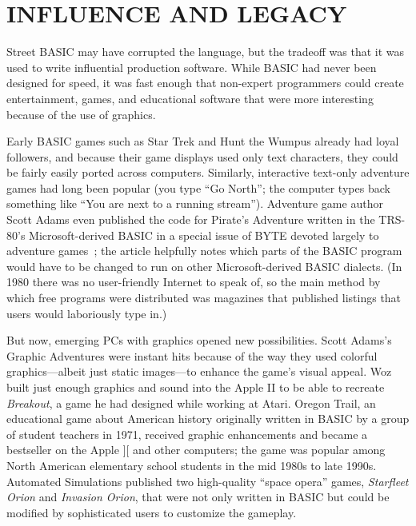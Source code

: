 

\section{INFLUENCE AND LEGACY}


Street BASIC may have corrupted the language, but the tradeoff was that
it was used to write influential production software.
While BASIC had never been designed for speed, it was fast enough that
non-expert programmers 
could create entertainment, games, and educational software that were
more interesting because of the use of graphics.

Early BASIC games such as Star Trek and Hunt the Wumpus already had loyal
followers, and because their game displays used only text characters,
they could be fairly easily ported across computers.
Similarly, interactive text-only adventure games had long been
popular (you type ``Go North''; the computer types back something like
``You are next to a running stream'').  Adventure game author Scott
Adams even published the code for Pirate's Adventure 
written in the 
TRS-80's Microsoft-derived BASIC in a special issue of BYTE devoted
largely to adventure games~\cite{byte80:adventure}; the article
helpfully notes which parts of the BASIC program would have to be
changed to run on other Microsoft-derived BASIC dialects.  (In 1980
there was no user-friendly Internet to speak of, so the main method by
which free programs were distributed was magazines that published
listings that 
users would laboriously type in.)

But now, emerging PCs with graphics opened
new possibilities.
Scott Adams's Graphic Adventures
were instant hits because of the way they used colorful
graphics---albeit just static images---to enhance the game's visual
appeal.  
Woz built just enough graphics and sound into the
Apple II to be able to recreate 
\emph{Breakout}, a game he had designed while working at Atari.
Oregon Trail, an educational game about American history originally
written in BASIC by a group of student teachers
in 1971, received graphic enhancements and became
a bestseller on the Apple ][ and other computers;
the game was popular among
North American elementary school students in the mid 1980s to late
1990s.  
Automated Simulations published two high-quality ``space opera'' games,
\emph{Starfleet Orion} and \emph{Invasion Orion}, that were not only
written in BASIC but could be modified by sophisticated users to
customize the gameplay.

